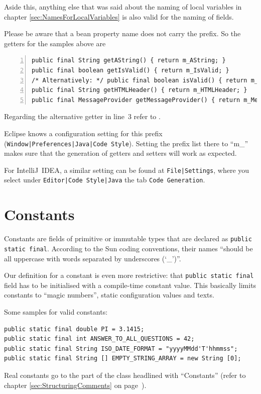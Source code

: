 \documentclass[11pt,a4paper, titlepage, parskip=half, headsepline, footsepline, cleardoublepage=current, headheight=1cm]{scrbook}
\newcommand*{\tqref}[1]{\hyperref[{#1}]{\ref*{#1}}}
\newcommand*{\tqvref}[1]{\hyperref[{#1}]{\ref*{#1}} on page~\pageref{#1}}
\begin{document}
Aside this, anything else that was said about the naming of local variables in chapter \tqref{sec:NamesForLocalVariables} is also valid for the naming of fields.

Please be aware that a bean property name does not carry the prefix. So the getters for the samples above are
\begin{lstlisting}[numbers=left]
public final String getAString() { return m_AString; }
public final boolean getIsValid() { return m_IsValid; }
/* Alternatively: */ public final boolean isValid() { return m_IsValid; }
public final String getHTMLHeader() { return m_HTMLHeader; }
public final MessageProvider getMessageProvider() { return m_MessageProvider; }
\end{lstlisting}
Regarding the alternative getter in line~3 refer to \autocite{ORACLE_DOC_JAVABEANS:Chapter8_3_2}.

Eclipse knows a configuration setting for this prefix (\verb#Window|Preferences|Java|Code Style#). Setting the prefix list there to “m\_” makes sure that the generation of getters and setters will work as expected.

For IntelliJ~IDEA, a similar setting can be found at \verb#File|Settings#, where you select under \verb#Editor|Code Style|Java# the tab \verb#Code Generation#.

\section{Constants}\label{sec:Constants}
Constants are fields of primitive or immutable types that are declared as \lstinline|public static final|. According to the Sun coding conventions, their names “should be all uppercase with words separated by underscores (‘\_’)”\autocite{SUN_CODE_CONVENTIONS:NamingConventions}.

Our definition for a constant is even more restrictive: that \lstinline|public static final| field has to be initialised with a compile-time constant value. This basically limits constants to “magic numbers”, static configuration values and texts.

Some samples for valid constants:
\begin{lstlisting}
public static final double PI = 3.1415;
public static final int ANSWER_TO_ALL_QUESTIONS = 42;
public static final String ISO_DATE_FORMAT = "yyyyMMdd'T'hhmmss";
public static final String [] EMPTY_STRING_ARRAY = new String [0];
\end{lstlisting}
Real constants go to the part of the class headlined with “Constants” (refer to chapter \tqvref{sec:StructuringComments}).
\end{document}
